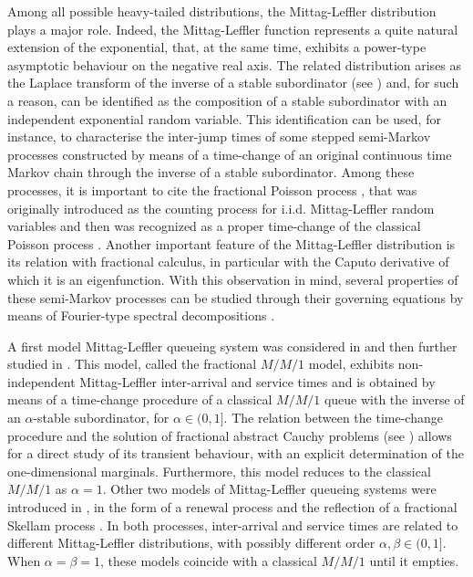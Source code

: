 \documentclass[]{amsart}
\numberwithin{equation}{section}
\theoremstyle{remark}
\theoremstyle{definition}
\begin{document}
Among all possible heavy-tailed distributions, the Mittag-Leffler distribution plays a major role. Indeed, the Mittag-Leffler function represents a quite natural extension of the exponential, that, at the same time, exhibits a power-type asymptotic behaviour on the negative real axis. The related distribution arises as the Laplace transform of the inverse of a stable subordinator (see \cite{bingham1971limit}) and, for such a reason, can be identified as the composition of a stable subordinator with an independent exponential random variable. This identification can be used, for instance, to characterise the inter-jump times of some stepped semi-Markov processes constructed by means of a time-change of an original continuous time Markov chain through the inverse of a stable subordinator. Among these processes, it is important to cite the fractional Poisson process \cite{mainardi2004fractional,laskin2003fractional}, that was originally introduced as the counting process for i.i.d. Mittag-Leffler random variables and then was recognized as a proper time-change of the classical Poisson process \cite{meerschaert2011fractional}. Another important feature of the Mittag-Leffler distribution is its relation with fractional calculus, in particular with the Caputo derivative of which it is an eigenfunction. With this observation in mind, several properties of these semi-Markov processes can be studied through their governing equations by means of Fourier-type spectral decompositions \cite{ascione2021fractional,ascione2021transient}.

A first model Mittag-Leffler queueing system was considered in \cite{cahoy2015transient} and then further studied in \cite{ascione2018fractional,ascione2022skorokhod}. This model, called the fractional $M/M/1$ model, exhibits non-independent Mittag-Leffler inter-arrival and service times and is obtained by means of a time-change procedure of a classical $M/M/1$ queue with the inverse of an $\alpha$-stable subordinator, for $\alpha \in (0,1]$. The relation between the time-change procedure and the solution of fractional abstract Cauchy problems (see \cite{baeumer2001stochastic}) allows for a direct study of its transient behaviour, with an explicit determination of the one-dimensional marginals. Furthermore, this model reduces to the classical $M/M/1$ as $\alpha=1$. Other two models of Mittag-Leffler queueing systems were introduced in \cite{butt2023queuing}, in the form of a renewal process and the reflection of a fractional Skellam process \cite{kerss2014fractional}. In both processes, inter-arrival and service times are related to different Mittag-Leffler distributions, with possibly different order $\alpha,\beta \in (0,1]$. When $\alpha=\beta=1$, these models coincide with a classical $M/M/1$ until it empties. 
\end{document}
